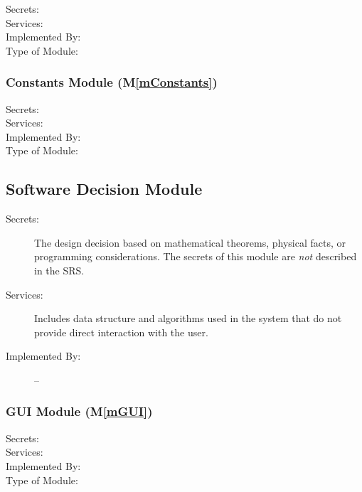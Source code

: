\documentclass[12pt, titlepage]{article}
\newcommand{\mref}[1]{M\ref{#1}}
\begin{document}
\begin{description}
\item[Secrets:]
\item[Services:]
\item[Implemented By:]
\item[Type of Module:] 
  
\end{description}

\subsubsection{ Constants Module (\mref{mConstants})}

\begin{description}
\item[Secrets:]
\item[Services:]
\item[Implemented By:]
\item[Type of Module:] 
  
\end{description}


\subsection{Software Decision Module}

\begin{description}
\item[Secrets:] The design decision based on mathematical theorems, physical
  facts, or programming considerations. The secrets of this module are
  \emph{not} described in the SRS.
\item[Services:] Includes data structure and algorithms used in the system that
  do not provide direct interaction with the user. 
\item[Implemented By:] --
\end{description}

\subsubsection{GUI Module (\mref{mGUI})}

\begin{description}
\item[Secrets:]
\item[Services:]
\item[Implemented By:]
\item[Type of Module:] 
  
\end{description}
\end{document}
